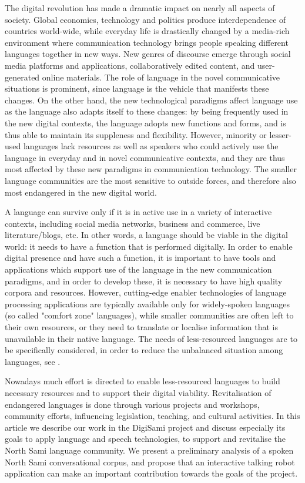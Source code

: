\documentclass[runningheads,a4paper]{llncs}
\begin{document}
The digital revolution has made a dramatic impact on nearly all aspects of society. Global economics, technology and politics produce interdependence of countries world-wide, while everyday life is drastically changed by a media-rich
environment where communication technology brings people speaking different languages together in new ways.
New genres of discourse emerge through social media platforms and applications, collaboratively edited content, and user-generated online materials.
The role of language in the novel communicative situations is prominent, since language is the vehicle that manifests these changes.
On the other hand, the new technological paradigms affect language use as the language also adapts itself to these changes: by being frequently used in the new digital contexts,
the language adopts new functions and forms, and is thus able to maintain its suppleness and flexibility.
However, minority or lesser-used languages lack resources as well as speakers who could actively use the language in everyday and in novel communicative contexts, and they are thus most affected by these new paradigms in communication technology. The smaller language communities are the most sensitive to outside forces, and therefore also most endangered in the new digital world.

A language can survive only if it is in active use in a variety of interactive contexts, including social media networks, business and commerce, live literature/blogs, etc.
In other words, a language should be viable in the digital world: it needs to have a function that is performed digitally. In order to enable digital presence and have such a function, it is important to have tools and applications which support use of the language in the new communication paradigms, and in order to develop these, it is necessary to have high quality corpora and resources. However, cutting-edge enabler technologies of language processing applications are typically available only for widely-spoken languages (so called "comfort zone" languages), while smaller communities are often left to their own resources, or they need to translate or localise information that is unavailable in their native language. The needs of less-resourced languages are to be specifically considered, in order to reduce the unbalanced situation among languages, see \cite{Soria:ea:13}.

Nowadays much effort is directed to enable less-resourced languages to build necessary resources and to support their digital viability. Revitalisation of endangered languages is
done through various projects and workshops, community efforts, influencing legislation, teaching, and cultural activities. In this article we describe our work in the DigiSami project and discuss especially its goals to apply language and speech technologies, to support and revitalise the North Sami language community. We present a preliminary analysis of a spoken North Sami conversational corpus, and propose that an interactive talking robot application can make an important contribution towards the goals of the project.
\end{document}
